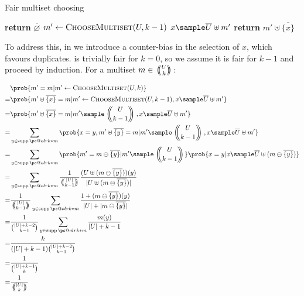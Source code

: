\documentclass[letterpaper,luatex,11pt]{article}
\makeatletter
\renewcommand{\supportname}{supp}
\renewcommand{\supp}[1]{\ensuremath{\operatorname{\supportname}\pc@olrk*{#1}}}
\newcommand{\multichoose}[2]{
\left.\mathchoice
  {\left(\kern-0.48em\binom{#1}{#2}\kern-0.48em\right)}
  {\big(\kern-0.30em\binom{\smash{#1}}{\smash{#2}}\kern-0.30em\big)}
  {\left(\kern-0.30em\binom{\smash{#1}}{\smash{#2}}\kern-0.30em\right)}
  {\left(\kern-0.30em\binom{\smash{#1}}{\smash{#2}}\kern-0.30em\right)}
\right.}
\makeatother
\begin{document}


\begin{algorithm}
\caption{Fair multiset choosing}
\begin{algorithmic}[0]
        \State \textbf{return} $\overline{\varnothing}$
    \Else
        \State $m' \leftarrow \textproc{ChooseMultiset}(U, k-1)$
        \State $x \sample \overline{U} \uplus m'$
        \State \textbf{return} $m' \uplus \overline{\{x\}}$
    \EndIf
\EndProcedure
\end{algorithmic}
\end{algorithm}

To address this, in  we introduce a
counter-bias in the selection of $x$, which favours duplicates.
 is trivially fair for $k = 0$, so we assume
it is fair for $k - 1$ and proceed by induction. For a multiset $m \in
\multichoose{U}{k}$:

\begin{align*}
    &\prob{m' = m | m' \leftarrow \textproc{ChooseMultiset}(U, k)}
    \\
    =&
    \prob{m' \uplus \overline{\{x\}} = m
        | m' \leftarrow \textproc{ChooseMultiset}(U, k-1), x \sample \overline{U} \uplus m'}
    \\
    =&
    \prob{m' \uplus \overline{\{x\}} = m
        | m' \sample \multichoose{U}{k - 1}, x \sample \overline{U} \uplus m'}
    \\
    =&
    \sum_{y \in \supp{m}}
    \prob{x = y, m' \uplus \overline{\{y\}} = m
        | m' \sample \multichoose{U}{k - 1}, x \sample \overline{U} \uplus m'}
    \\
    =&
    \sum_{y \in \supp{m}}
    \prob{m' = m \ominus \overline{\{y\}} | m' \sample \multichoose{U}{k - 1}}
    \prob{x = y | x \sample \overline{U} \uplus (m \ominus \overline{\{y\}})}
    \\
    =&
    \sum_{y \in \supp{m}}
    \frac{1}{\multichoose{|U|}{k - 1}}
    \frac{(U \uplus (m \ominus \overline{\{y\}}))(y)}{|U \uplus (m \ominus \overline{\{y\}})|}
    \\
    =&
    \frac{1}{\multichoose{|U|}{k - 1}}
    \sum_{y \in \supp{m}}
    \frac{1 + (m \ominus \overline{\{y\}})(y)}{|U| + |m \ominus \overline{\{y\}}|}
    \\
    =&
    \frac{1}{\binom{|U| + k - 2}{k-1}}
    \sum_{y \in \supp{m}}
    \frac{m(y)}{|U| + k -1}
    \\
    =& \frac{k}{(|U| + k -1)\binom{|U| + k - 2}{k-1}}
    \\
    =& \frac{1}{\binom{|U| + k - 1}{k}}
    \\
    =& \frac{1}{\multichoose{|U|}{k}}
\end{align*}
\end{document}
